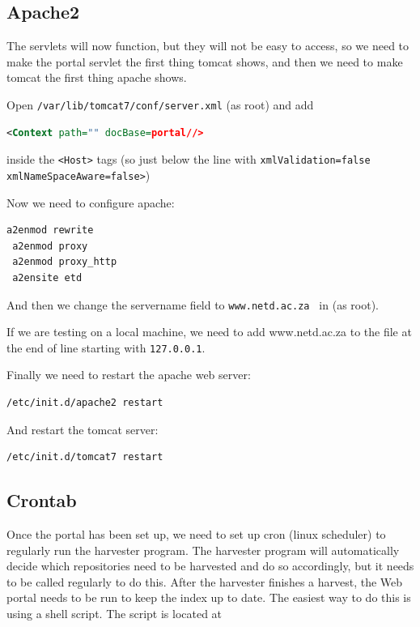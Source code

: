 \documentclass[a4paper,11pt]{article}
\begin{document}
\subsection{Apache2}
\label{sec:installation_process:apache2}

The servlets will now function, but they will not be easy to access, so we need to make the portal servlet the first thing tomcat shows, and then we need to make tomcat the first thing apache shows.

Open \texttt{/var/lib/tomcat7/conf/server.xml} (as root) and add 

\begin{lstlisting}[language=XML]
 <Context path="" docBase=portal//> 
\end{lstlisting}

inside the \texttt{<Host>} tags (so just below the line with \texttt{xmlValidation=false xmlNameSpaceAware=false>})

Now we need to configure apache: 

\begin{lstlisting}[language=bash]
 a2enmod rewrite 
 a2enmod proxy 
 a2enmod proxy_http 
 a2ensite etd
\end{lstlisting}

And then we change the servername field to \texttt{www.netd.ac.za } in  (as root).

If we are testing on a local machine, we need to add www.netd.ac.za to the  file at the end of line starting with \texttt{127.0.0.1}.

Finally we need to restart the apache web server: 

\begin{lstlisting}[language=bash]
 /etc/init.d/apache2 restart
\end{lstlisting}

And restart the tomcat server: 

\begin{lstlisting}[language=bash]
 /etc/init.d/tomcat7 restart
\end{lstlisting}

\subsection{Crontab}
\label{sec:installation_process:crontab}

Once the portal has been set up, we need to set up cron (linux scheduler) to regularly run the harvester program. The harvester program will automatically decide which repositories need to be harvested and do so accordingly, but it needs to be called regularly to do this. After the harvester finishes a harvest, the Web portal needs to be run to keep the index up to date. The easiest way to do this is using a shell script. The script is located at 
\end{document}
